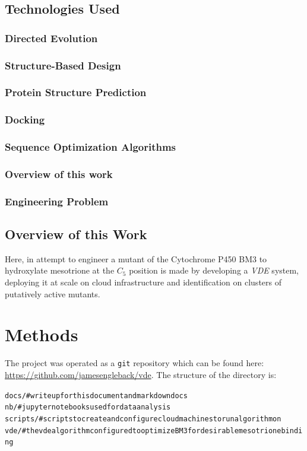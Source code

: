 \documentclass[16pt]{article}
\begin{document}
\subsection{Technologies Used}
\subsubsection{Directed Evolution}
\subsubsection{Structure-Based Design}
\subsubsection{Protein Structure Prediction}
\subsubsection{Docking}
\subsubsection{Sequence Optimization Algorithms}
\subsubsection{Overview of this work}
\subsubsection{Engineering Problem}
\subsection{Overview of this Work}

Here, in attempt to engineer a mutant of the Cytochrome P450 BM3 to hydroxylate mesotrione at the $C_5$ position is made by developing a \textit{VDE} system, deploying it at scale on cloud infrastructure and identification on clusters of putatively active mutants.
\section{Methods}

The project was operated as a  \texttt{git} repository which can be found here: \href{https://github.com/jamesengleback/vde}{https://github.com/jamesengleback/vde}.
The structure of the directory is:

\begin{alltt}
docs/         # write up for this document and markdown docs
nb/           # jupyter notebooks used for data analysis
scripts/      # scripts to create and configure cloud machines to run algorithm on
vde/          # the vde algorithm configured to optimize BM3 for desirable mesotrione binding
\end{alltt}
\end{document}
